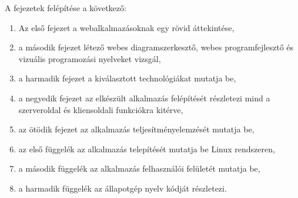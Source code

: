 \clearpage
A fejezetek felépítése a következő:

\begin{enumerate}
\item Az első fejezet a webalkalmazásoknak egy rövid áttekintése, 
\item a második fejezet létező webes diagramszerkesztő, webes programfejlesztő és vizuális programozási nyelveket vizsgál,
\item a harmadik fejezet a kiválasztott technológiákat mutatja be,
\item a negyedik fejezet az elkészült alkalmazás felépítését részletezi mind a szerveroldal és kliensoldali funkciókra kitérve,
\item az ötödik fejezet az alkalmazás teljesítményelemzését mutatja be,
\item az első függelék az alkalmazás telepítését mutatja be Linux rendszeren,
\item a második függelék az alkalmazás felhasználói felületét mutatja be,
\item a harmadik függelék az állapotgép nyelv kódját részletezi.
\end{enumerate}